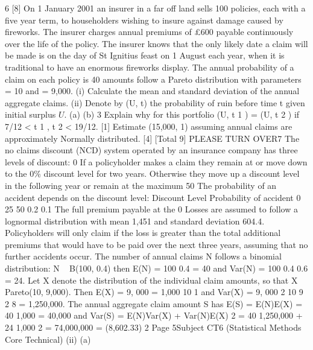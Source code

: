 \documentclass[a4paper,12pt]{article}
\begin{document}
\begin{enumerate}

6
[8]
On 1 January 2001 an insurer in a far off land sells 100 policies, each with a five year
term, to householders wishing to insure against damage caused by fireworks. The
insurer charges annual premiums of £600 payable continuously over the life of the
policy.
The insurer knows that the only likely date a claim will be made is on the day of
St Ignitius feast on 1 August each year, when it is traditional to have an enormous
fireworks display. The annual probability of a claim on each policy is 40%
amounts follow a Pareto distribution with parameters = 10 and = 9,000.
(i) Calculate the mean and standard deviation of the annual aggregate claims. 
(ii) Denote by (U, t) the probability of ruin before time t given initial surplus $U$.
(a)
(b)
3
Explain why for this portfolio (U, t 1 ) = (U, t 2 ) if
7/12 < t 1 , t 2 < 19/12.
[1]
Estimate (15,000, 1) assuming annual claims are approximately
Normally distributed.
[4]
[Total 9]
PLEASE TURN OVER7
The no claims discount (NCD) system operated by an insurance company has three levels of discount: 0%
If a policyholder makes a claim they remain at or move down to the 0\% discount level
for two years. Otherwise they move up a discount level in the following year or remain at the maximum 50%
The probability of an accident depends on the discount level:
Discount Level Probability of accident
0%
25%
50%
0.2
0.1
The full premium payable at the 0%
Losses are assumed to follow a lognormal distribution with mean 1,451 and standard deviation 604.4.
Policyholders will only claim if the loss is greater than the total additional premiums that would have to be paid over the next three years, assuming that no further accidents occur.
The number of annual claims N follows a binomial distribution:
N ~ B(100, 0.4) then
E(N) = 100
0.4 = 40
and
Var(N) = 100
0.4
0.6 = 24.
Let X denote the distribution of the individual claim amounts, so that X ~
Pareto(10, 9,000). Then
E(X) =
9, 000
= 1,000
10 1
and
Var(X) =
9, 000 2 10
9 2 8
= 1,250,000.
The annual aggregate claim amount S has
E(S) = E(N)E(X) = 40
1,000 = 40,000
and
Var(S) = E(N)Var(X) + Var(N)E(X) 2
= 40
1,250,000 + 24
1,000 2
= 74,000,000
= (8,602.33) 2
Page 5Subject CT6 (Statistical Methods Core Technical)
(ii)
(a)

\end{enumerate}
\end{document}
